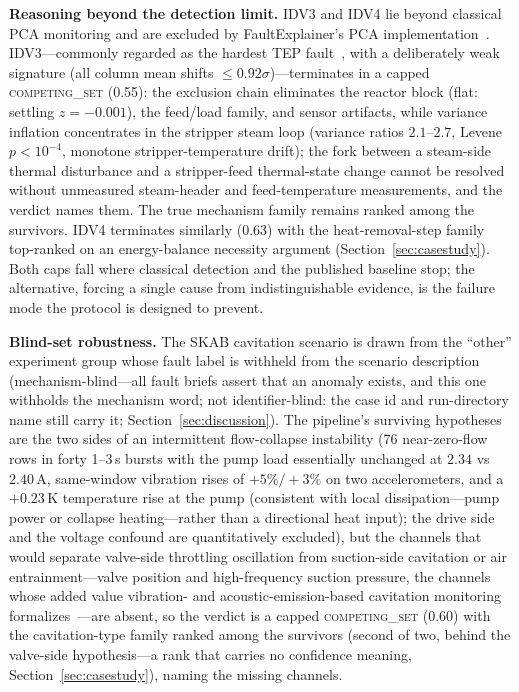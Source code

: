 \documentclass[preprint,12pt]{elsarticle}
\begin{document}
\textbf{Reasoning beyond the detection limit.} IDV3 and IDV4 lie beyond classical PCA monitoring and are excluded by FaultExplainer's PCA implementation~\cite{russell2000delay,chiang2001fault,khan2024faultexplainer}. IDV3---commonly regarded as the hardest TEP fault~\cite{russell2000delay}, with a deliberately weak signature (all column mean shifts $\le 0.92\sigma$)---terminates in a capped \mbox{\textsc{competing\_set}} (0.55): the exclusion chain eliminates the reactor block (flat: settling $z{=}{-}0.001$), the feed/load family, and sensor artifacts, while variance inflation concentrates in the stripper steam loop (variance ratios $2.1$--$2.7$, Levene $p{<}10^{-4}$, monotone stripper-temperature drift); the fork between a steam-side thermal disturbance and a stripper-feed thermal-state change cannot be resolved without unmeasured steam-header and feed-temperature measurements, and the verdict names them. The true mechanism family remains ranked among the survivors. IDV4 terminates similarly (0.63) with the heat-removal-step family top-ranked on an energy-balance necessity argument (Section~\ref{sec:casestudy}). Both caps fall where classical detection and the published baseline stop; the alternative, forcing a single cause from indistinguishable evidence, is the failure mode the protocol is designed to prevent.

\textbf{Blind-set robustness.} The SKAB cavitation scenario is drawn from the ``other'' experiment group whose fault label is withheld from the scenario description (mechanism-blind---all fault briefs assert that an anomaly exists, and this one withholds the mechanism word; not identifier-blind: the case id and run-directory name still carry it; Section~\ref{sec:discussion}). The pipeline's surviving hypotheses are the two sides of an intermittent flow-collapse instability (76 near-zero-flow rows in forty 1--3\,s bursts with the pump load essentially unchanged at $2.34$ vs $2.40$\,A, same-window vibration rises of $+5\%/+3\%$ on two accelerometers, and a $+0.23$\,K temperature rise at the pump (consistent with local dissipation---pump power or collapse heating---rather than a directional heat input); the drive side and the voltage confound are quantitatively excluded), but the channels that would separate valve-side throttling oscillation from suction-side cavitation or air entrainment---valve position and high-frequency suction pressure, the channels whose added value vibration- and acoustic-emission-based cavitation monitoring formalizes~\cite{alfayez2005detection}---are absent, so the verdict is a capped \mbox{\textsc{competing\_set}} (0.60) with the cavitation-type family ranked among the survivors (second of two, behind the valve-side hypothesis---a rank that carries no confidence meaning, Section~\ref{sec:casestudy}), naming the missing channels.
\end{document}
